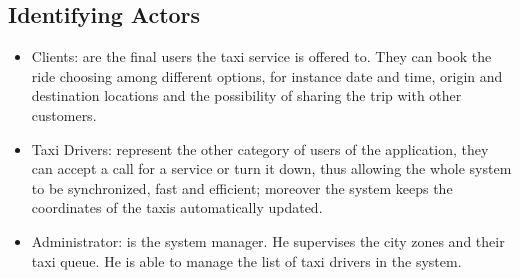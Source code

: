 \documentclass[a4paper,11pt]{report} %
\begin{document}
	\subsection{Identifying Actors}
		\begin{itemize}
			\item Clients: are the final users the taxi service is offered to. They can book the ride choosing among different options, for instance date and time, origin and destination locations and the possibility of sharing the trip with other customers.
			\item Taxi Drivers: represent the other category of users of the application, they can accept a call for a service or turn it down, thus allowing the whole system to be synchronized, fast and efficient; moreover the system keeps the coordinates of the taxis automatically updated.
			
			\item Administrator: is the system manager. He supervises the city zones and their taxi queue. He is able to manage the list of taxi drivers in the system.
		\end{itemize}
	
\end{document}
